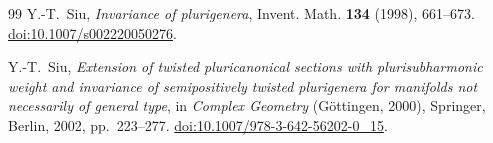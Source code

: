 \documentclass[11pt,a4paper]{article}
\theoremstyle{definition}\newtheorem{definition}[theorem]{Definition}
\theoremstyle{remark}\newtheorem*{remark}{Remark}
\begin{document}
\begin{thebibliography}{99}
Y.-T.~Siu,
\emph{Invariance of plurigenera},
Invent. Math. \textbf{134} (1998), 661--673.
\href{https://doi.org/10.1007/s002220050276}{doi:10.1007/s002220050276}.

Y.-T.~Siu,
\emph{Extension of twisted pluricanonical sections with plurisubharmonic
weight and invariance of semipositively twisted plurigenera for manifolds
not necessarily of general type},
in \emph{Complex Geometry} (Göttingen, 2000),
Springer, Berlin, 2002, pp.~223--277.
\href{https://doi.org/10.1007/978-3-642-56202-0_15}{doi:10.1007/978-3-642-56202-0\_15}.

\end{thebibliography}
\end{document}
